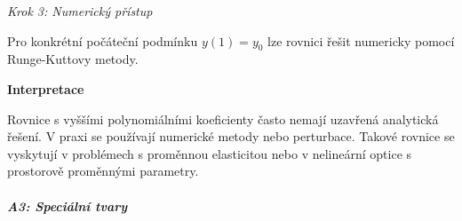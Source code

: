 \begin{example}
        \noindent\textit{Krok 3: Numerický přístup}
        
        Pro konkrétní počáteční podmínku $y(1) = y_0$ lze rovnici řešit numericky pomocí Runge-Kuttovy metody.
        
        \vspace{1.5\baselineskip}
        
        \noindent\textbf{Interpretace}
        
        Rovnice s vyššími polynomiálními koeficienty často nemají uzavřená analytická řešení. 
        V praxi se používají numerické metody nebo perturbace. Takové rovnice se vyskytují 
        v problémech s proměnnou elasticitou nebo v nelineární optice s prostorově proměnnými 
        parametry.
        
        \end{example}
        
        \vspace{2\baselineskip}
        
        \subparagraph*{A3: Speciální tvary}
        \label{subpar:a3-specialni-tvary}
        

